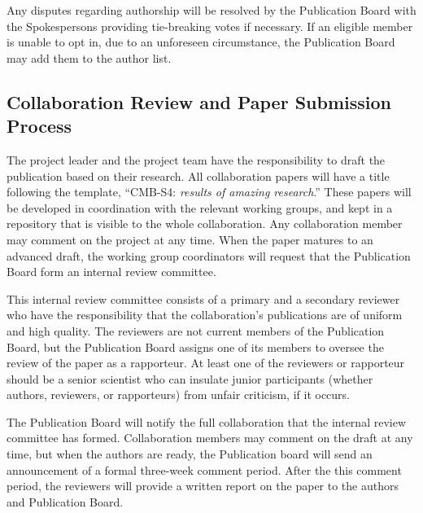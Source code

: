 Any disputes regarding authorship will be resolved by the Publication Board with the Spokespersons providing  tie-breaking votes if necessary.  If an eligible member is unable to opt in, due to an unforeseen circumstance, the Publication Board may add them to the author list.

\subsection{Collaboration Review and Paper Submission Process}
 
The project leader and the project team have the responsibility to draft the publication based on their research.  All collaboration papers will have a title following the template, ``CMB-S4: \textit{results of amazing research}.''  These papers will be developed in coordination with the relevant working groups, and kept in a repository that is visible to the whole collaboration.  Any collaboration member may comment on the project at any time.  When the paper matures to an advanced draft, the working group coordinators will request that the Publication Board form an internal review committee.  

This internal review committee consists of a primary and a secondary reviewer who have the responsibility that the collaboration's publications are of uniform and high quality.  The reviewers are not current members of the Publication Board, but the Publication Board assigns one of its members to oversee the review of the paper as a rapporteur.  At least one of the reviewers or rapporteur should be a senior scientist who can insulate junior participants (whether authors, reviewers, or rapporteurs) from unfair criticism, if it occurs.

The Publication Board will notify the full collaboration that the internal review committee has formed.  Collaboration members may comment on the draft at any time, but when the authors are ready, the Publication board will send an announcement of a formal three-week comment period.  After the this comment period, the reviewers will provide a written report on the paper to the authors and Publication Board.

